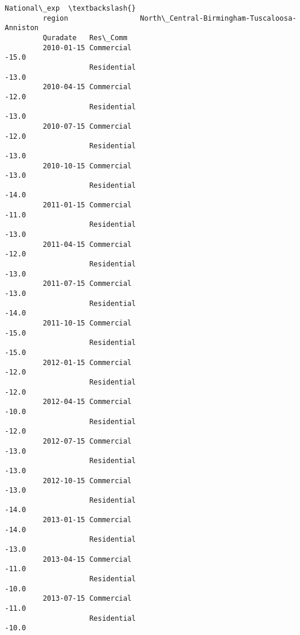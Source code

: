 \documentclass[11pt]{article}
\begin{document}
\begin{Verbatim}[commandchars=\\\{\}]
                                                                National\_exp  \textbackslash{}
         region                 North\_Central-Birmingham-Tuscaloosa-Anniston   
         Quradate   Res\_Comm                                                   
         2010-01-15 Commercial                                         -15.0   
                    Residential                                        -13.0   
         2010-04-15 Commercial                                         -12.0   
                    Residential                                        -13.0   
         2010-07-15 Commercial                                         -12.0   
                    Residential                                        -13.0   
         2010-10-15 Commercial                                         -13.0   
                    Residential                                        -14.0   
         2011-01-15 Commercial                                         -11.0   
                    Residential                                        -13.0   
         2011-04-15 Commercial                                         -12.0   
                    Residential                                        -13.0   
         2011-07-15 Commercial                                         -13.0   
                    Residential                                        -14.0   
         2011-10-15 Commercial                                         -15.0   
                    Residential                                        -15.0   
         2012-01-15 Commercial                                         -12.0   
                    Residential                                        -12.0   
         2012-04-15 Commercial                                         -10.0   
                    Residential                                        -12.0   
         2012-07-15 Commercial                                         -13.0   
                    Residential                                        -13.0   
         2012-10-15 Commercial                                         -13.0   
                    Residential                                        -14.0   
         2013-01-15 Commercial                                         -14.0   
                    Residential                                        -13.0   
         2013-04-15 Commercial                                         -11.0   
                    Residential                                        -10.0   
         2013-07-15 Commercial                                         -11.0   
                    Residential                                        -10.0   

\end{Verbatim}
\end{document}
